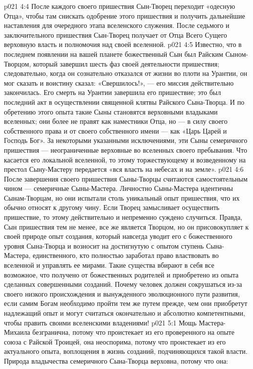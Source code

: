 \vs p021 4:4 После каждого своего пришествия Сын\hyp{}Творец переходит «одесную Отца», чтобы там снискать одобрение этого пришествия и получить дальнейшие наставления для очередного этапа вселенского служения. После седьмого и заключительного пришествия Сын\hyp{}Творец получает от Отца Всего Сущего верховную власть и полномочия над своей вселенной.
\vs p021 4:5 \pc Известно, что в последнем появлении на вашей планете божественный Сын был Райским Сыном\hyp{}Творцом, который завершил шесть фаз своей деятельности пришествия; следовательно, когда он сознательно отказался от жизни во плоти на Урантии, он мог сказать и воистину сказал: «Свершилось!», --- его миссия действительно закончилась. Его смерть на Урантии завершила его пришествие; это был последний акт в осуществлении священной клятвы Райского Сына\hyp{}Творца. И по обретению этого опыта такие Сыны становятся верховными владыками вселенных; они более не правят как наместники Отца, но --- в силу своего собственного права и от своего собственного имени --- как «Царь Царей и Господь Бог». За некоторыми указанными исключениями, эти Сыны семеричного пришествия --- неограниченные верховные во вселенных своего пребывания. Что касается его локальной вселенной, то этому торжествующему и возведенному на престол Сыну\hyp{}Мастеру передается «вся власть на небесах и на земле».
\vs p021 4:6 \pc После завершения своего пришествия Сыны\hyp{}Творцы считаются самостоятельным чином --- семеричные Сыны\hyp{}Мастера. Личностно Сыны\hyp{}Мастера идентичны Сынам\hyp{}Творцам, но они испытали столь уникальный опыт пришествия, что их обычно относят к другому чину. Если Творец замысливает осуществить пришествие, то этому действительно и непременно суждено случиться. Правда, Сын пришествия тем не менее, все же является Творцом, но он присовокупляет к своей природе опыт создания, который навсегда уводит его с божественного уровня Сына\hyp{}Творца и возносит на достигнутую с опытом ступень Сына\hyp{}Мастера, единственного, кто полностью заработал право властвовать во вселенной и управлять ее мирами. Такие существа вбирают в себя все возможное, что получено от божественных родителей и приобретено из опыта сделанных совершенными созданий. Почему человек должен сокрушаться из\hyp{}за своего низкого происхождения и вынужденного эволюционного пути развития, если самим Богам необходимо пройти тем же путем прежде, чем они приобретут надлежащий опыт и могут считаться окончательно и абсолютно компетентными, чтобы править своими вселенскими владениями!
\vs p021 5:1 Мощь Мастера\hyp{}Михаила безгранична, потому что проистекает из его проверенного на опыте союза с Райской Троицей, она неоспорима, потому что проистекает из его актуального опыта, воплощения в жизнь созданий, подчиняющихся такой власти. Природа владычества семеричного Сына\hyp{}Творца верховна, потому что она:
